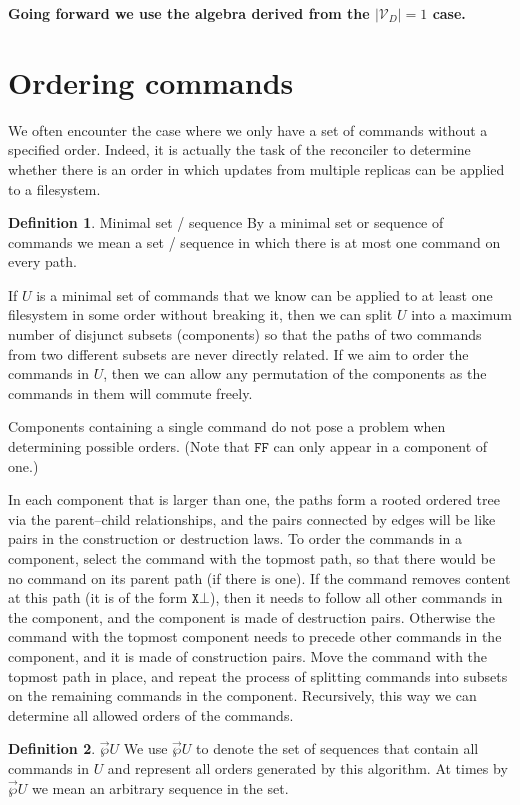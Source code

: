 \documentclass[12pt]{article}
\newcommand{\setvx}[1]{\mathcal{V}_{#1}}
\newcommand{\setd}{\setvx{D}}
\newcommand{\empt}{\bot}
\newcommand{\fscommand}[2]{{#1#2}}
\newcommand{\fsregcommandchar}[1]{\mathtt{#1}}
\newcommand{\fsregcommand}[2]{\fscommand{\fsregcommandchar{#1}}{\fsregcommandchar{#2}}}
\newcommand{\cff}{\fsregcommand{F}{F}}
\newcommand{\orderset}[1]{\vec{\wp}{#1}}
\theoremstyle{definition}
\newtheorem{mydef}{Definition}
\begin{document}
{\bf Going forward we use the algebra derived from the $|\setd|=1$ case.}

\section{Ordering commands}

We often encounter the case where we only have a set of commands without a specified order.
Indeed, it is actually the task of the reconciler to determine whether there is an order
in which updates from multiple replicas can be applied to a filesystem.

\begin{mydef}{Minimal set / sequence}
By a minimal set or sequence of commands we mean a set / sequence in which
there is at most one command on every path.
\end{mydef}

If $U$ is a minimal set of commands
that we know can be applied to at least one filesystem in some order without breaking it,
then we can split $U$ into a maximum number of disjunct subsets
(components) so that the paths of two commands from two different subsets are never directly related.
If we aim to order the commands in $U$, then we can allow any permutation of 
the components as the commands in them will commute freely.

Components containing a single command do not pose a problem when determining
possible orders.
(Note that $\cff$ can only appear in a component of one.)

In each component that is larger than one, the paths 
form a rooted ordered tree via the parent--child relationships,
and the pairs connected by edges will be like pairs in the
construction or destruction laws.
To order the commands in a component,
select the command with the topmost path, so that there would be no command
on its parent path (if there is one). 
If the command removes content at this path (it is of the form $\fsregcommand{X}{\empt}$), then it
needs to follow all other commands in the component, and
the component is made of destruction pairs.
Otherwise the command with the topmost component needs to precede other commands
in the component, and it is made of construction pairs.
Move the command with the topmost path in place, and
repeat the process of splitting commands into subsets on the remaining commands
in the component. Recursively, this way we can determine all allowed orders of the commands.

\begin{mydef}{$\orderset{U}$}
We use $\orderset{U}$ to denote the set of sequences that contain all commands in $U$
and represent all orders generated by this algorithm.
At times by $\orderset{U}$ we mean an arbitrary sequence in the set.
\end{mydef}
\end{document}
